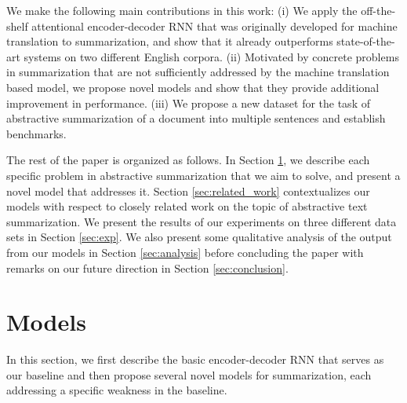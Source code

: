 \documentclass[11pt]{article}
\begin{document}
We make the following main contributions in this work: (i) We apply the off-the-shelf attentional encoder-decoder RNN that was originally developed for machine translation to summarization, and show that it already outperforms state-of-the-art systems on two different English corpora. (ii) Motivated by concrete problems in summarization that are not sufficiently addressed by the machine translation based model, we propose novel models and show that they provide additional improvement in performance. (iii) We propose a new dataset for the task of abstractive summarization of a document into multiple sentences and establish benchmarks.  

The rest of the paper is organized as follows. In Section \ref{sec:models}, we describe each specific problem in abstractive summarization that we aim to solve, and present a novel model that addresses it. Section \ref{sec:related_work} contextualizes our models with respect to closely related work on the topic of abstractive text summarization. We present the results of our experiments on three different data sets in Section \ref{sec:exp}. We also present some qualitative analysis of the output from our models in Section \ref{sec:analysis} before concluding the paper with remarks on our future direction in Section \ref{sec:conclusion}.




 
\section{Models}\label{sec:models}
In this section, we first describe the basic encoder-decoder RNN that serves as our baseline and then propose several novel models for summarization, each addressing a specific weakness in the baseline.
\end{document}
